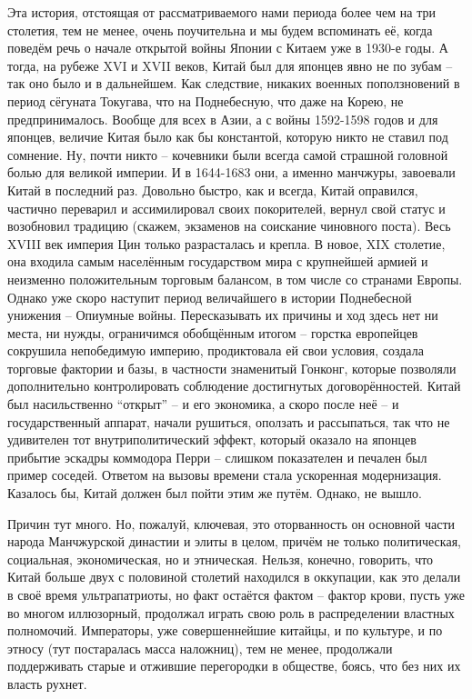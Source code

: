 Эта история, отстоящая от рассматриваемого нами периода более чем на три столетия, тем не менее, очень поучительна и мы будем вспоминать её, когда поведём речь о начале открытой войны Японии с Китаем уже в 1930-е годы. А тогда, на рубеже XVI и XVII веков, Китай был для японцев явно не по зубам – так оно было и в дальнейшем. Как следствие, никаких военных поползновений в период сёгуната Токугава, что на Поднебесную, что даже на Корею, не предпринималось. Вообще для всех в Азии, а с войны 1592-1598 годов и для японцев, величие Китая было как бы константой, которую никто не ставил под сомнение. Ну, почти никто – кочевники были всегда самой страшной головной болью для великой империи. И в 1644-1683 они, а именно манчжуры, завоевали Китай в последний раз. Довольно быстро, как и всегда, Китай оправился, частично переварил и ассимилировал своих покорителей, вернул свой статус и возобновил традицию (скажем, экзаменов на соискание чиновного поста). Весь XVIII век империя Цин только разрасталась и крепла. В новое, XIX столетие, она входила самым населённым государством мира с крупнейшей армией и неизменно положительным торговым балансом, в том числе со странами Европы. Однако уже скоро наступит период величайшего в истории Поднебесной унижения – Опиумные войны. Пересказывать их причины и ход здесь нет ни места, ни нужды, ограничимся обобщённым итогом – горстка европейцев сокрушила непобедимую империю, продиктовала ей свои условия, создала торговые фактории и базы, в частности знаменитый Гонконг, которые позволяли дополнительно контролировать соблюдение достигнутых договорённостей. Китай был насильственно “открыт” – и его экономика, а скоро после неё – и государственный аппарат, начали рушиться, оползать и рассыпаться, так что не удивителен тот внутриполитический эффект, который оказало на японцев прибытие эскадры коммодора Перри – слишком показателен и печален был пример соседей. Ответом на вызовы времени стала ускоренная модернизация. Казалось бы, Китай должен был пойти этим же путём. Однако, не вышло.

Причин тут много. Но, пожалуй, ключевая, это оторванность он основной части народа Манчжурской династии и элиты в целом, причём не только политическая, социальная, экономическая, но и этническая. Нельзя, конечно, говорить, что Китай больше двух с половиной столетий находился в оккупации, как это делали в своё время ультрапатриоты, но факт остаётся фактом – фактор крови, пусть уже во многом иллюзорный, продолжал играть свою роль в распределении властных полномочий. Императоры, уже совершеннейшие китайцы, и по культуре, и по этносу (тут постаралась масса наложниц), тем не менее, продолжали поддерживать старые и отжившие перегородки в обществе, боясь, что без них их власть рухнет.

